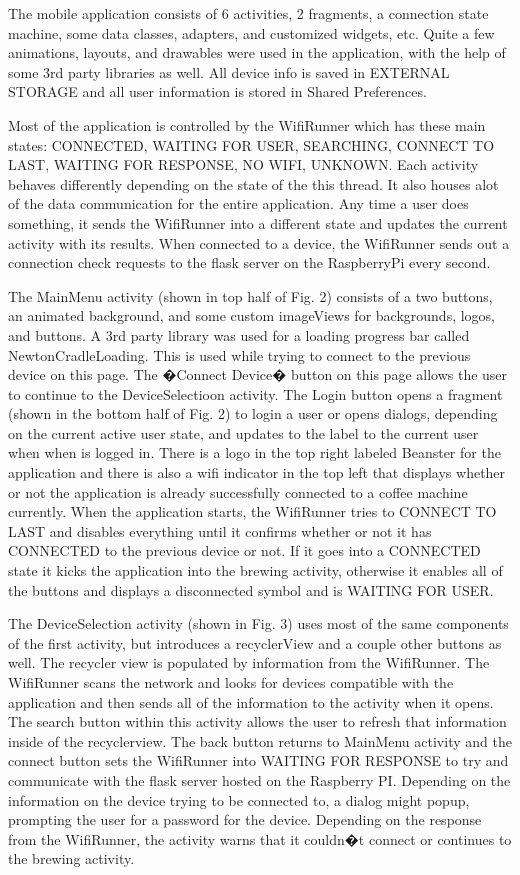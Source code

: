 \documentclass[conference]{IEEEtran}
\begin{document}
The mobile application consists of 6 activities,
2 fragments, a connection state machine, some data
classes, adapters, and customized widgets, etc. Quite a few
animations, layouts, and drawables were used in the application,
with the help of some 3rd party libraries as well. All
device info is saved in EXTERNAL STORAGE and all user
information is stored in Shared Preferences.

Most of the application is controlled by the WifiRunner
which has these main states: CONNECTED, WAITING
FOR USER, SEARCHING, CONNECT TO LAST,
WAITING FOR RESPONSE, NO WIFI, UNKNOWN. Each
activity behaves differently depending on the state of the this
thread. It also houses alot of the data communication for the
entire application. Any time a user does something, it sends
the WifiRunner into a different state and updates the current
activity with its results. When connected to a device, the
WifiRunner sends out a connection check requests to the flask
server on the RaspberryPi every second.

The MainMenu activity (shown in top half of Fig. 2)
consists of a two buttons, an animated background, and some
custom imageViews for backgrounds, logos, and buttons. A
3rd party library was used for a loading progress bar called
NewtonCradleLoading. This is used while trying to connect
to the previous device on this page. The �Connect Device�
button on this page allows the user to continue to the DeviceSelectioon
activity. The Login button opens a fragment
(shown in the bottom half of Fig. 2) to login a user or
opens dialogs, depending on the current active user state, and
updates to the label to the current user when when is logged
in. There is a logo in the top right labeled Beanster for the
application and there is also a wifi indicator in the top left that
displays whether or not the application is already successfully
connected to a coffee machine currently. When the application
starts, the WifiRunner tries to CONNECT TO LAST and
disables everything until it confirms whether or not it has
CONNECTED to the previous device or not. If it goes into a
CONNECTED state it kicks the application into the brewing
activity, otherwise it enables all of the buttons and displays a
disconnected symbol and is WAITING FOR USER.

The DeviceSelection activity (shown in Fig. 3) uses most
of the same components of the first activity, but introduces a
recyclerView and a couple other buttons as well. The recycler
view is populated by information from the WifiRunner. The
WifiRunner scans the network and looks for devices compatible
with the application and then sends all of the information
to the activity when it opens. The search button within this
activity allows the user to refresh that information inside
of the recyclerview. The back button returns to MainMenu
activity and the connect button sets the WifiRunner into
WAITING FOR RESPONSE to try and communicate with
the flask server hosted on the Raspberry PI. Depending on
the information on the device trying to be connected to, a
dialog might popup, prompting the user for a password for
the device. Depending on the response from the WifiRunner,
the activity warns that it couldn�t connect or continues to the
brewing activity.
\end{document}
